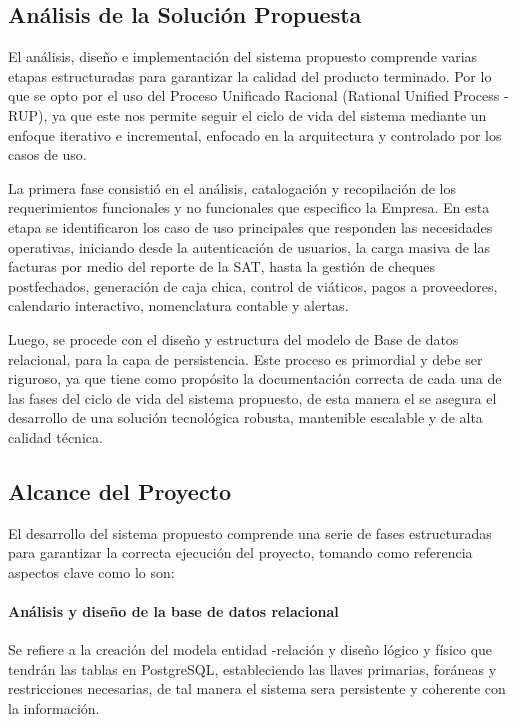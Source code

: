 \subsection{Análisis de la Solución Propuesta}

El análisis, diseño e implementación del sistema propuesto comprende varias etapas estructuradas para garantizar la calidad del producto terminado. Por lo que se opto por el uso del Proceso Unificado Racional (Rational Unified Process - RUP), ya que este nos permite seguir el ciclo de vida del sistema mediante un enfoque iterativo e incremental, enfocado en la arquitectura y controlado por los casos de uso.

La primera fase consistió en el análisis, catalogación y recopilación de los requerimientos funcionales y no funcionales que especifico la Empresa. En esta etapa se identificaron los caso de uso principales que responden las necesidades operativas, iniciando desde la autenticación de usuarios, la carga masiva de las facturas por medio del reporte de la SAT, hasta la gestión de cheques postfechados, generación de caja chica, control de viáticos, pagos a proveedores, calendario interactivo, nomenclatura contable y alertas.

Luego, se procede con el diseño y estructura del modelo de Base de datos relacional, para la capa de persistencia. Este proceso es primordial y debe ser riguroso, ya que tiene como propósito la documentación correcta de cada una de las fases del ciclo de vida del sistema propuesto, de esta manera el se asegura el desarrollo de una solución tecnológica robusta, mantenible escalable y de alta calidad técnica.

\subsection{Alcance del Proyecto}

El desarrollo del sistema propuesto comprende una serie de fases estructuradas para garantizar la correcta ejecución del proyecto, tomando como referencia aspectos clave como lo son:


\paragraph{Análisis y diseño de la base de datos relacional} Se refiere a la creación del modela entidad -relación y diseño lógico y físico que tendrán las tablas en PostgreSQL, estableciendo las llaves primarias, foráneas y restricciones necesarias, de tal manera el sistema sera persistente y coherente con la información.

